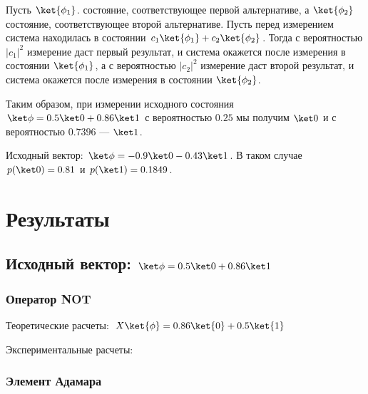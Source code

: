 \documentclass{article}
\begin{document}
Пусть $\ket{\phi_1}$. состояние, соответствующее первой альтернативе, а
$\ket{\phi_2}$ состояние, соответствующее второй альтернативе. Пусть перед
измерением система находилась в состоянии $c_1\ket{\phi_1} + c_2\ket{\phi_2}$.
Тогда с вероятностью $|c_1|^2$ измерение даст первый результат, и система
окажется после измерения в состоянии $\ket{\phi_1}$, а с вероятностью $|c_2|^2$
измерение даст второй результат, и система окажется после измерения в состоянии
$\ket{\phi_2}$.

Таким образом, при измерении исходного состояния $\ket\phi = 0.5\ket0
+0.86\ket1$ с вероятностью $0.25$ мы получим $\ket0$ и с вероятностью $0.7396$
--- $\ket1$.

Исходный вектор: $\ket\phi = -0.9\ket0-0.43\ket1$. В таком случае
$p(\ket0)=0.81$ и $p(\ket1)=0.1849$.

\section{Результаты}

\subsection{Исходный вектор: $\ket\phi = 0.5\ket0+0.86\ket1$}
 
\subsubsection{Оператор NOT}
 
Теоретические расчеты: $X\ket{\phi} = 0.86\ket{0}+0.5\ket{1}$
 
Экспериментальные расчеты:
 
\begin{figure}[H]
\end{figure}
 
\subsubsection{Элемент Адамара}
 
\end{document}
